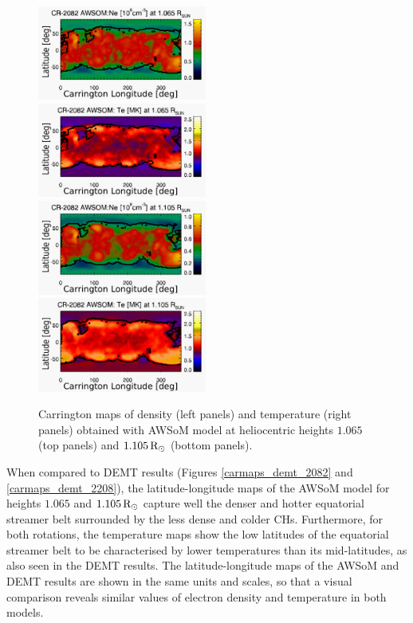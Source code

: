 \documentclass[namedreferences]{solarphysics}
\newcommand{\mrsun}{{\rm R_\odot}}
\begin{document}
\begin{article}
\begin{figure}[h!]
\begin{center}
\includegraphics[width=0.495\textwidth]{map_Ne_awsom_2082_185_short_1065_Rsun2.pdf}
\includegraphics[width=0.495\textwidth]{map_Te_awsom_2082_185_short_1065_Rsun2.pdf}
\includegraphics[width=0.495\textwidth]{map_Ne_awsom_2082_185_short_1105_Rsun2.pdf}
\includegraphics[width=0.495\textwidth]{map_Te_awsom_2082_185_short_1105_Rsun2.pdf}
\caption{Carrington maps of density (left panels) and temperature (right panels) obtained with AWSoM model at heliocentric heights $1.065$ (top panels) and $1.105\,\mrsun$ (bottom panels).}
\label{carmaps_awsom_2082}
\end{center}
\end{figure}

{When compared to DEMT results (Figures \ref{carmaps_demt_2082} and \ref{carmaps_demt_2208}), the latitude-longitude maps of the AWSoM model for heights $1.065$ and $1.105\,\mrsun$ capture well the denser and hotter equatorial streamer belt surrounded by the less dense and colder CHs. Furthermore, for both rotations, the temperature maps show the low latitudes of the equatorial streamer belt to be characterised by lower temperatures than its mid-latitudes, as also seen in the DEMT results. The latitude-longitude maps of the AWSoM and DEMT results are shown in the same units and scales, so that a {visual comparison reveals} similar values of electron density and temperature in both models.}


\end{article}
\end{document}
